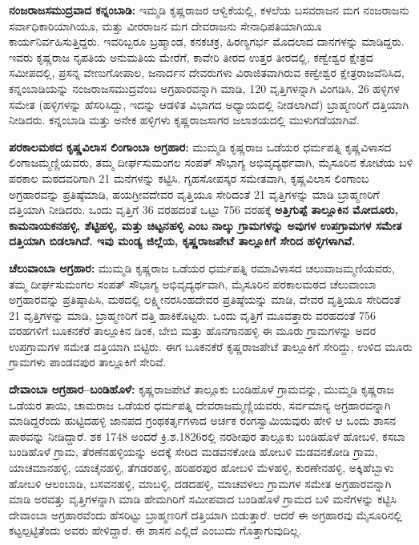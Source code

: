 \textbf{ನಂಜರಾಜಸಮುದ್ರವಾದ ಕನ್ನಂಬಾಡಿ:} ಇಮ್ಮಡಿ ಕೃಷ್ಣರಾಜರ ಆಳ್ವಿಕೆಯಲ್ಲಿ, ಕಳಲೆಯ ಬಸವರಾಜನ ಮಗ ನಂಜರಾಜನು ಸರ್ವಾಧಿಕಾರಿಯಾಗಿಯೂ, ಮತ್ತು ವೀರರಾಜನ ಮಗ ದೇವರಾಜನು ಸೇನಾಧಿಪತಿಯಾಗಿಯೂ ಕಾರ್ಯನಿರ್ವಹಿಸುತ್ತಿದ್ದರು. ಇವರಿಬ್ಬರೂ ಬ್ರಹ್ಮಾಂಡ, ಕನಕಚಕ್ರ, ಹಿರಣ್ಯಗರ್ಭ ಮೊದಲಾದ ದಾನಗಳನ್ನು ಮಾಡಿದ್ದರು. ಇವರು ಕೃಷ್ಣರಾಜ ನೃಪತಿಯ ಅನುಮತಿಯ ಮೇರೆಗೆ, ಕಾವೇರಿ ತೀರದ ಉತ್ತರ ತೀರದಲ್ಲಿ, ಕಣ್ವೇಶ್ವರ ಕ್ಷೇತ್ರದ ಸಮೀಪದಲ್ಲಿ, ಪ್ರಸನ್ನ ವೇಣುಗೋಪಾಲ, ಜನಾರ್ದನ ದೇವರುಗಳು ವಿರಾಜಿತವಾಗಿರುವ ಕಣ್ವೇಶ್ವರ ಕ್ಷೇತ್ರರಾಜವೆನಿಸಿದ, ಕನ್ನಂಬಾಡಿಯನ್ನು ನಂಜರಾಜಸಮುದ್ರವೆಂಬ ಅಗ್ರಹಾರವನ್ನಾಗಿ ಮಾಡಿ, 120 ವೃತ್ತಿಗಳನ್ನಾಗಿ ವಿಂಗಡಿಸಿ, 26 ಹಳ್ಳಿಗಳ ಸಮೇತ (ಹಳ್ಳಿಗಳನ್ನು ಹೆಸರಿಸಿದ್ದು, ಇದನ್ನು ಆಡಳಿತ ವಿಭಾಗದ ಅಧ್ಯಾಯದಲ್ಲಿ ನೀಡಲಾಗಿದೆ) ಬ್ರಾಹ್ಮಣರಿಗೆ ದತ್ತಿಯಾಗಿ ನೀಡಿದರು. ಕನ್ನಂಬಾಡಿ ಮತ್ತು ಅನೇಕ ಹಳ್ಳಿಗಳು ಕೃಷ್ಣರಾಜಸಾಗರ ಜಲಾಶಯದಲ್ಲಿ ಮುಳುಗಡೆಯಾಗಿವೆ.

\textbf{ಪರಕಾಲಮಠದ ಕೃಷ್ಣವಿಲಾಸ ಲಿಂಗಾಂಬಾ ಅಗ್ರಹಾರ:} ಮುಮ್ಮಡಿ ಕೃಷ್ಣರಾಜ ಒಡೆಯರ ಧರ್ಮಪತ್ನಿ ಕೃಷ್ಣವಿಳಾಸದ ಲಿಂಗಾಜಮ್ಮಣ್ಣಿಯವರು, ತಮ್ಮ ದೀರ್ಘಸುಮಂಗಲ ಸಂಪತ್​ ಸೌಭಾಗ್ಯ ಅಭಿವೃದ್ಯರ್ಥವಾಗಿ, ಮೈಸೂರಿನ ಕೋಟೆಯ ಬಳಿ ಪರಕಾಲ ಮಠದವರಿಗಾಗಿ 21 ಮನೆಗಳನ್ನು ಕಟ್ಟಿಸಿ. ಗೃಹಸೋಪಸ್ಕರ ಸಮೇತವಾಗಿ, ಕೃಷ್ಣವಿಲಾಸ ಲಿಂಗಾಂಬ ಅಗ್ರಹಾರವನ್ನು ಪ್ರತಿಷ್ಠೆಮಾಡಿ, ಹಯಗ್ರೀವದೇವರ ವೃತ್ತಿಯೂ ಸೇರಿದಂತೆ 21 ವೃತ್ತಿಗಳನ್ನು ಮಾಡಿ ಬ್ರಾಹ್ಮಣರಿಗೆ ದತ್ತಿಯಾಗಿ ನೀಡಿದರು. ಒಂದು ವೃತ್ತಿಗೆ 36 ವರಹದಂತೆ ಒಟ್ಟು 756 ವರಹಕ್ಕೆ \textbf{ಅತ್ತಿಗುಪ್ಪೆ ತಾಲ್ಲೂಕಿನ ಮೋದೂರು, ಕಾಮನಾಯಕನಹಳ್ಳಿ, ಶೆಟ್ಟಿಹಳ್ಳಿ, ಮತ್ತು ಚಿಟ್ಟನಹಳ್ಳಿ ಎಂಬ ನಾಲ್ಕು ಗ್ರಾಮಗಳನ್ನು ಅವುಗಳ ಉಪಗ್ರಾಮಗಳ ಸಮೇತ ದತ್ತಿಯಾಗಿ ಬಿಡಲಾಗಿದೆ. ಇವು ಮಂಡ್ಯ ಜಿಲ್ಲೆಯ, ಕೃಷ್ಣರಾಜಪೇಟೆ ತಾಲ್ಲೂಕಿಗೆ ಸೇರಿದ ಹಳ್ಳಿಗಳಾಗಿವೆ. }

\textbf{ಚೆಲುವಾಂಬಾ ಅಗ್ರಹಾರ:} ಮುಮ್ಮಡಿ ಕೃಷ್ಣರಾಜ ಒಡೆಯರ ಧರ್ಮಪತ್ನಿ ರಮಾವಿಳಾಸದ ಚಲುವಾಜಮ್ಮಣಿಯವರು, ತಮ್ಮ ದೀರ್ಘಸುಮಂಗಲ ಸಂಪತ್​ ಸೌಭಾಗ್ಯ ಅಭಿವೃದ್ಯರ್ಥವಾಗಿ, ಮೈಸೂರಿನ ಪರಕಾಲಮಠದ ಚೆಲುವಾಂಬಾ ಅಗ್ರಹಾರವನ್ನು ಪ್ರತಿಷ್ಠಾಪಿಸಿ, ಮಠದಲ್ಲಿ ಲಕ್ಷ್ಮೀನರಸಿಂಹದೇವರ ಪ್ರತಿಷ್ಠೆಯನ್ನು ಮಾಡಿ, ದೇವರ ವೃತ್ತಿಯೂ ಸೇರಿದಂತೆ 21 ವೃತ್ತಿಗಳನ್ನು ಮಾಡಿ, ಬ್ರಾಹ್ಮಣರಿಗೆ ದತ್ತಿ ಹಾಕಿಕೊಟ್ಟರು. ಒಂದು ವೃತ್ತಿಗೆ ಮೂವತ್ತಾರು ವರಹದಂತೆ 756 ವರಹಗಳಿಗೆ ಬೂಕನಕೆರೆ ತಾಲ್ಲೂಕಿನ ಡಿಂಕ, ಬೇಬಿ ಮತ್ತು ಹೊನಗಾನಹಳ್ಳಿ ಈ ಮೂರು ಗ್ರಾಮಗಳನ್ನು ಅದರ ಉಪಗ್ರಾಮಗಳ ಸಮೇತ ದತ್ತಿಯಾಗಿ ಬಿಟ್ಟಿರು. ಈಗ ಬೂಕನಕೆರೆ ಕೃಷ್ಣರಾಜಪೇಟೆ ತಾಲ್ಲೂಕಿಗೆ ಸೇರಿದ್ದು, ಉಳಿದ ಮೂರು ಗ್ರಾಮಗಳು ಪಾಂಡವಪುರ ತಾಲ್ಲೂಕಿಗೆ ಸೇರಿವೆ.

\textbf{ದೇವಾಂಬಾ ಅಗ್ರಹಾರ–ಬಂಡಿಹೊಳೆ:} ಕೃಷ್ಣರಾಜಪೇಟೆ ತಾಲ್ಲೂಕು ಬಂಡಿಹೊಳೆ ಗ್ರಾಮವನ್ನು, ಮುಮ್ಮಡಿ ಕೃಷ್ಣರಾಜ ಒಡೆಯರ ತಾಯಿ, ಚಾಮರಾಜ ಒಡೆಯರ ಧರ್ಮಪತ್ನಿ ದೇವರಾಜಮ್ಮಣ್ಣಿಯವರು, ಸರ್ವಮಾನ್ಯ ಅಗ್ರಹಾರವನ್ನಾಗಿ ಮಾಡಿದ್ದರೆಂದು ಹುಟ್ಟಿದಹಳ್ಳಿ ಜಾನಪದ ಗ್ರಂಥಕರ್ತೃಗಳಾದ ಅರ್ಚಕ ರಂಗಸ್ವಾಮಿಯವುರು ಹೇಳಿ ಆ ಒಂದು ಶಾಸನ ಪಾಠವನ್ನು ನೀಡಿದ್ದಾರೆ. ಶಕ 1748 ಅಂದರೆ ಕ್ರಿ.ಶ.1826ರಲ್ಲಿ ನರಶೀಪುರ ತಾಲ್ಲೂಕು ಬಂಡಿಹೊಳೆ ಹೋಬಳಿ, ಕಸಬಾ ಬಂಡಿಹೊಳೆ ಗ್ರಾಮ, ತೆರಣೆನಹಳ್ಳಿಯನ್ನು ಅದಕ್ಕೆ ಸೇರಿದ ಮಡವನಕೋಡಿ ಹೋಬಳಿ ಮಡವನಕೋಡಿ ಗ್ರಾಮ, ಯಾಚಮಾನಹಳ್ಳಿ, ಯಾಚೈನಹಳ್ಳಿ, ತೆಗಡರಹಳ್ಳಿ, ಹರಿಹರಪುರ ಹೋಬಳಿ ಮೆಳಹಳ್ಳಿ, ಕುರಣೇನಹಳ್ಳಿ, ಅಕ್ಕಿಹೆಬ್ಬಾಳು ಹೋಬಳಿ ಆಲಂಬಾಡಿ, ಬಸವನಹಳ್ಳಿ, ಮಾಬಳ್ಳಿ, ದಡದಹಳ್ಳಿ, ಮಾಚವಳಲು ಗ್ರಾಮಗಳ ಸಮೇತ ಅಗ್ರಹಾರವನ್ನಾಗಿ ಮಾಡಿ ಅರವತ್ತು ವೃತ್ತಿಗಳನ್ನಾಗಿ ಮಾಡಿ ಹೇಮಗಿರಿಗೆ ಸಮೀಪವಾದ ಬಂಡಿಹೊಳೆ ಗ್ರಾಮದ ಬಳಿ ಮನೆಗಳನ್ನು ಕಟ್ಟಿಸಿ ದೇವಾಂಬಾ ಅಗ್ರಹಾರವೆಂದು ಹೆಸರಿಟ್ಟು ಬ್ರಾಹ್ಮಣರಿಗೆ ದತ್ತಿಯಾಗಿ ಬಿಡುತ್ತಾರೆ. ಆದರೆ ಈ ಅಗ್ರಹಾರವು ಮೈಸೂರಿನಲ್ಲಿ ಕಟ್ಟಲ್ಪಟ್ಟಿತೆಂದು ಅವರು ಹೇಳಿದ್ದಾರೆ. ಈ ಶಾಸನ ಎಲ್ಲಿದೆ ಎಂಬುದು ಗೊತ್ತಾಗುವುದಿಲ್ಲ.

